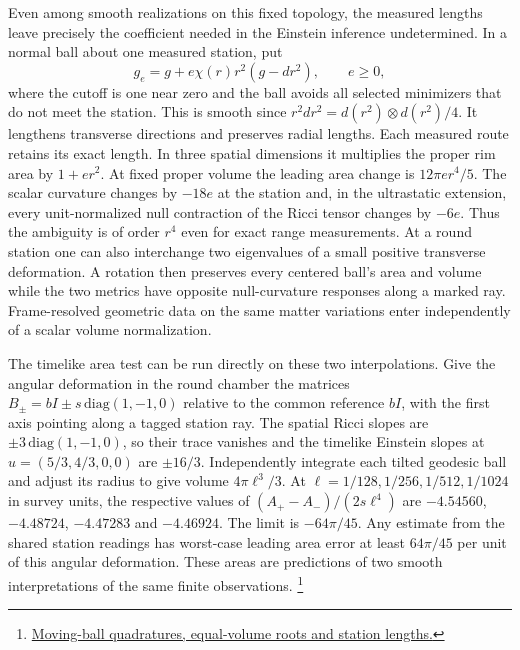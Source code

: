 \documentclass[11pt]{article}
\begin{document}
Even among smooth realizations on this fixed topology, the measured
lengths leave precisely the coefficient needed in the Einstein inference
undetermined. In a normal ball about one measured station, put
\[
 g_e=g+e\chi(r)r^2(g-dr^2),\qquad e\geq0,
\]
where the cutoff is one near zero and the ball avoids all selected
minimizers that do not meet the station. This is smooth since
$r^2dr^2=d(r^2)\otimes d(r^2)/4$. It lengthens transverse directions
and preserves radial lengths. Each measured route retains its exact
length. In three spatial dimensions it multiplies the proper rim area
by $1+er^2$. At fixed proper volume the leading area change is
$12\pi e r^4/5$. The scalar curvature changes by $-18e$ at the station
and, in the ultrastatic extension, every unit-normalized null
contraction of the Ricci tensor changes by $-6e$.
Thus the ambiguity is of order $r^4$ even for exact range measurements.
At a round station one can also interchange two eigenvalues of a small
positive transverse deformation. A rotation then preserves every
centered ball's area and volume while the two metrics have opposite
null-curvature responses along a marked ray. Frame-resolved geometric
data on the same matter variations enter independently of a scalar
volume normalization.

The timelike area test can be run directly on these two interpolations.
Give the angular deformation in the round chamber the matrices
$B_\pm=bI\pm s\,\mathrm{diag}(1,-1,0)$ relative to the common reference
$bI$, with the first axis pointing along a tagged station ray.
The spatial Ricci slopes are $\pm3\,\mathrm{diag}(1,-1,0)$, so their
trace vanishes and the timelike Einstein slopes at
$u=(5/3,4/3,0,0)$ are $\pm16/3$. Independently integrate each tilted
geodesic ball and adjust its radius to give volume $4\pi\ell^3/3$.
At $\ell=1/128,1/256,1/512,1/1024$ in survey units, the respective
values of $(A_+-A_-)/(2s\ell^4)$ are $-4.54560$, $-4.48724$,
$-4.47283$ and $-4.46924$. The limit is $-64\pi/45$. Any estimate from
the shared station readings has worst-case leading area error at least
$64\pi/45$ per unit of this angular deformation. These areas are predictions
of two smooth interpretations of the same finite observations.%
\footnote{\href{https://github.com/FloatingPragma/observer-patch-holography/tree/main/code/matched_einstein_limit/source_implication/full_geometry/station_balls/timelike_areas}{Moving-ball quadratures, equal-volume roots and station lengths.}}
\end{document}
